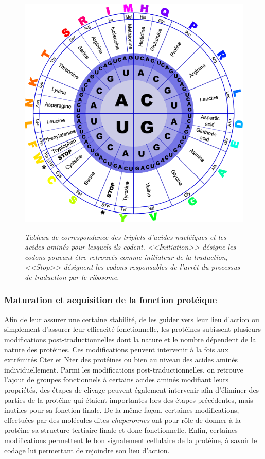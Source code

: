 \begin{figure}
  \centering
  {\includegraphics[width=0.75\linewidth]{./figures/ch1/codon_table_circle}}
    \caption{\it Tableau de correspondance des triplets d'acides nucléiques et les acides aminés pour lesquels ils codent. <<Initiation>> désigne les codons pouvant être retrouvés comme initiateur de la traduction, <<Stop>> désignent les codons responsables de l'arrêt du processus de traduction par le ribosome.}
    \label{Fig:codon_table}
  \hspace{0.2cm}
\end{figure}

\subsubsection{Maturation et acquisition de la fonction protéique}

Afin de leur assurer une certaine stabilité, de les guider vers leur lieu d'action ou simplement d'assurer leur efficacité fonctionnelle, les protéines subissent plusieurs modifications post-traductionnelles dont la nature et le nombre dépendent de la nature des protéines. Ces modifications peuvent intervenir à la fois aux extrémités Cter et Nter des protéines ou bien au niveau des acides aminés individuellement. Parmi les modifications post-traductionnelles, on retrouve l'ajout de groupes fonctionnels à certains acides aminés modifiant leurs propriétés, des étapes de clivage peuvent également intervenir afin d'éliminer des parties de la protéine qui étaient importantes lors des étapes précédentes, mais inutiles pour sa fonction finale. De la même façon, certaines modifications, effectuées par des molécules dites \textit{chaperonnes} ont pour rôle de donner à la protéine sa structure tertiaire finale et donc fonctionnelle. Enfin, certaines modifications permettent le bon signalement cellulaire de la protéine, à savoir le codage lui permettant de rejoindre son lieu d'action.

